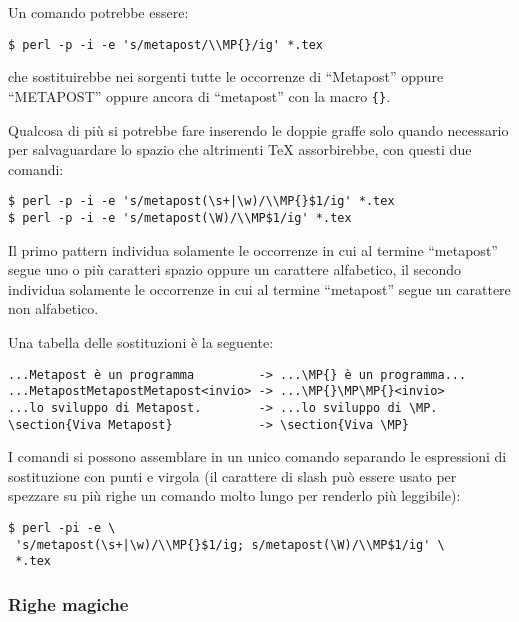 Un comando potrebbe essere:
\begin{verbatim}
$ perl -p -i -e 's/metapost/\\MP{}/ig' *.tex
\end{verbatim}
che sostituirebbe nei sorgenti tutte le occorrenze di ``Metapost'' oppure
``METAPOST'' oppure ancora di ``metapost'' con la macro \texttt{\{\}}.

Qualcosa di più si potrebbe fare inserendo le doppie graffe solo quando
necessario per salvaguardare lo spazio che altrimenti \TeX{} assorbirebbe, con
questi due comandi:
\begin{verbatim}
$ perl -p -i -e 's/metapost(\s+|\w)/\\MP{}$1/ig' *.tex
$ perl -p -i -e 's/metapost(\W)/\\MP$1/ig' *.tex
\end{verbatim}

Il primo pattern individua solamente le occorrenze in cui al termine
``metapost'' segue uno o più caratteri spazio oppure un carattere alfabetico,
il secondo individua solamente le occorrenze in cui al termine ``metapost''
segue un carattere non alfabetico.

Una tabella delle sostituzioni è la seguente:
\begin{Verbatim}[fontsize=\small]
...Metapost è un programma         -> ...\MP{} è un programma...
...MetapostMetapostMetapost<invio> -> ...\MP{}\MP\MP{}<invio>
...lo sviluppo di Metapost.        -> ...lo sviluppo di \MP.
\section{Viva Metapost}            -> \section{Viva \MP}
\end{Verbatim}

I comandi si possono assemblare in un unico comando separando le espressioni di
sostituzione con punti e virgola (il carattere di slash può essere usato per
spezzare su più righe un comando molto lungo per renderlo più leggibile):
\begin{verbatim}
$ perl -pi -e \
 's/metapost(\s+|\w)/\\MP{}$1/ig; s/metapost(\W)/\\MP$1/ig' \
 *.tex
\end{verbatim}

\subsubsection{Righe magiche}

